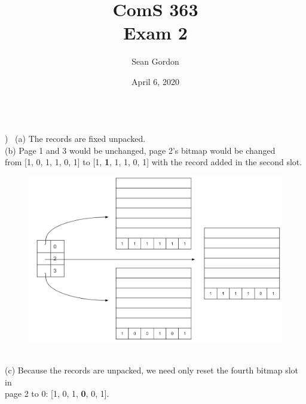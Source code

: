 \documentclass[12pt]{article}
\title{ComS 363\\Exam 2}
\author{Sean Gordon}
\date{April 6, 2020}
\begin{document}
\maketitle


\hrulefill \\[-.4em]



) \ (a) The records are fixed unpacked.\\
\indent (b) Page 1 and 3 would be unchanged, page 2's bitmap would be changed \\
\indent \indent from [1, 0, 1, 1, 0, 1] to [1, \textbf{1}, 1, 1, 0, 1] with the record added in the second slot.
\begin{figure}[h!]
  \centering
  \includegraphics[scale=.6]{Exam2Q1.JPG}
\end{figure}\\
\indent (c) Because the records are unpacked, we need only reset the fourth bitmap slot in \\
\indent \indent page 2 to 0: [1, 0, 1, \textbf{0}, 0, 1].


\hrulefill\\
\end{document}
